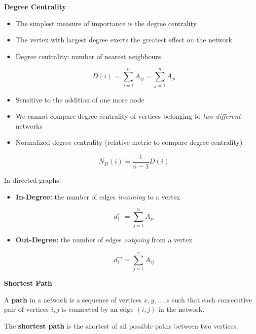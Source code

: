 \textbf{Degree Centrality}
\begin{itemize}
    \item The simplest measure of importance is the degree centrality
    \item The vertex with largest degree exerts the greatest effect on the network
    \item Degree centrality: number of nearest neighbours
          
          \begin{equation*}
              \boxed{D(i)=\sum _{j=1}^{n} A_{ij} =\sum _{j=1}^{n} A_{ji}}
          \end{equation*}
    \item Sensitive to the addition of one more node
    \item We cannot compare degree centrality of vertices belonging to \textit{two different} networks
    \item Normalized degree centrality (relative metric to compare degree centrality)
          
          \begin{equation*}
              \boxed{N_{D} (i)=\frac{1}{n-1} D(i)}
          \end{equation*}
\end{itemize}

In directed graphs:
\begin{itemize}
    \item \textbf{In-Degree:} the number of edges \textit{incoming} to a vertex
          
          \begin{equation*}
              d_{i}^{\leftarrow } =\sum _{j=1}^{n} A_{ji}
          \end{equation*}
    \item \textbf{Out-Degree:} the number of edges \textit{outgoing} from a vertex
          
          \begin{equation*}
              d_{i}^{\rightarrow } =\sum _{j=1}^{n} A_{ij}
          \end{equation*}
\end{itemize}

\textbf{Shortest Path}

A \textbf{path} in a network is a sequence of vertices $x,y,\dotsc ,z$ such that each consecutive pair of vertices $i,j$ is connected by an edge $(i,j)$ in the network.

The \textbf{shortest path} is the shortest of all possible paths between two vertices.

